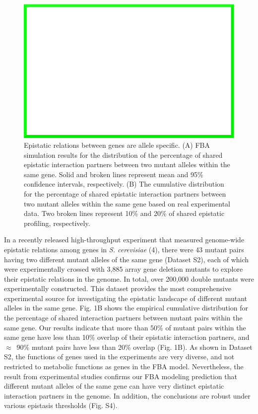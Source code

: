 \begin{figure}
\centering
\includegraphics[width=\textwidth]{dummy}
\caption{Epistatic relations between genes are allele specific. (A)
FBA simulation results for the distribution of the percentage of
shared epistatic interaction partners between two mutant alleles
within the same gene. Solid and broken lines represent mean and 95\%
confidence intervals, respectively. (B) The cumulative distribution
for the percentage of shared epistatic interaction partners between
two mutant alleles within the same gene based on real experimental
data. Two broken lines represent 10\% and 20\% of shared epistatic
profiling, respectively.}
\label{fig:alleleSpecific}
\end{figure}

In a recently released high-throughput experiment that measured
genome-wide epistatic relations among genes in \textit{S. cerevisiae} (4),
there were 43 mutant pairs having two different mutant alleles of the
same gene (Dataset S2), each of which were experimentally crossed with
3,885 array gene deletion mutants to explore their epistatic relations
in the genome. In total, over 200,000 double mutants were
experimentally constructed. This dataset provides the most
comprehensive experimental source for investigating the epistatic
landscape of different mutant alleles in the same gene. Fig. 1B shows
the empirical cumulative distribution for the percentage of shared
interaction partners between mutant pairs within the same gene. Our
results indicate that more than 50\% of mutant pairs within the same
gene have less than 10\% overlap of their epistatic interaction
partners, and $\approx$~90\% mutant pairs have less than 20\% overlap
(Fig. 1B). As shown in Dataset S2, the functions of genes used in the
experiments are very diverse, and not restricted to metabolic
functions as genes in the FBA model. Nevertheless, the result from
experimental studies confirms our FBA modeling prediction that
different mutant alleles of the same gene can have very distinct
epistatic interaction partners in the genome. In addition, the
conclusions are robust under various epistasis thresholds (Fig. S4).

